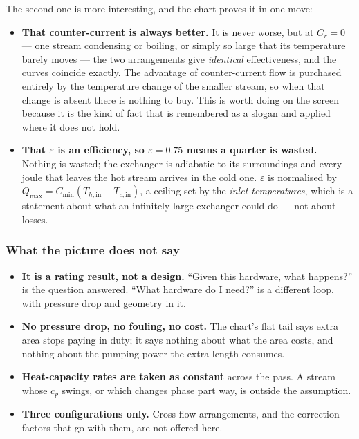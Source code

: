 \documentclass[11pt,a4paper]{article}
\begin{document}
The second one is more interesting, and the chart proves it in one move:

\begin{itemize}[leftmargin=*,nosep,topsep=4pt]
  \item \textbf{That counter-current is always better.}  It is never
        worse, but at $C_r = 0$ --- one stream condensing or boiling, or
        simply so large that its temperature barely moves --- the two
        arrangements give \emph{identical} effectiveness, and the curves
        coincide exactly.  The advantage of counter-current flow is
        purchased entirely by the temperature change of the smaller
        stream, so when that change is absent there is nothing to buy.
        This is worth doing on the screen because it is the kind of fact
        that is remembered as a slogan and applied where it does not hold.
  \item \textbf{That $\varepsilon$ is an efficiency, so $\varepsilon =
        0.75$ means a quarter is wasted.}  Nothing is wasted;
        the exchanger is adiabatic to its surroundings and every joule
        that leaves the hot stream arrives in the cold one.  $\varepsilon$
        is normalised by $Q_{\max} = C_{\min}(T_{h,\mathrm{in}} -
        T_{c,\mathrm{in}})$, a ceiling set by the \emph{inlet
        temperatures}, which is a statement about what an infinitely
        large exchanger could do --- not about losses.
\end{itemize}

\subsubsection*{What the picture does not say}

\begin{itemize}[leftmargin=*,nosep]
  \item \textbf{It is a rating result, not a design.}  ``Given this
        hardware, what happens?'' is the question answered.  ``What
        hardware do I need?'' is a different loop, with pressure drop and
        geometry in it.
  \item \textbf{No pressure drop, no fouling, no cost.}  The chart's flat
        tail says extra area stops paying in duty; it says nothing about
        what the area costs, and nothing about the pumping power the extra
        length consumes.
  \item \textbf{Heat-capacity rates are taken as constant} across the
        pass.  A stream whose $c_p$ swings, or which changes phase part
        way, is outside the assumption.
  \item \textbf{Three configurations only.}  Cross-flow arrangements, and
        the correction factors that go with them, are not offered here.
\end{itemize}
\end{document}
